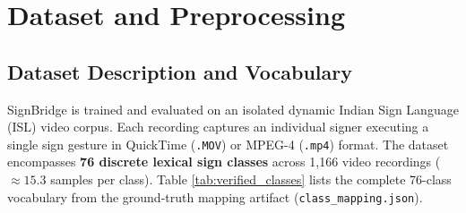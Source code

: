 \chapter{Dataset and Preprocessing}
\label{ch:dataset}

\section{Dataset Description and Vocabulary}
\label{sec:dataset_desc}
SignBridge is trained and evaluated on an isolated dynamic Indian Sign Language (ISL) video corpus. Each recording captures an individual signer executing a single sign gesture in QuickTime (\texttt{.MOV}) or MPEG-4 (\texttt{.mp4}) format. The dataset encompasses \textbf{76 discrete lexical sign classes} across 1,166 video recordings ($\approx 15.3$ samples per class). Table \ref{tab:verified_classes} lists the complete 76-class vocabulary from the ground-truth mapping artifact (\texttt{class\_mapping.json}).

